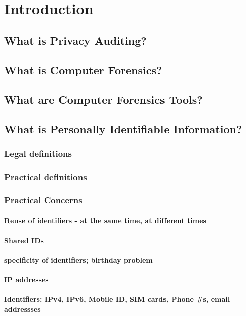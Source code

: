 \chapter{Introduction}
\section{What is Privacy Auditing?}
\section{What is Computer Forensics?}
\section{What are Computer Forensics Tools?}
\section{What is Personally Identifiable Information?}
\subsection{Legal definitions}
\subsection{Practical definitions}
\subsection{Practical Concerns}
\subsubsection{Reuse of identifiers - at the same time, at different times}
\subsubsection{Shared IDs}
\subsubsection{specificity of identifiers; birthday problem}
\subsubsection{IP addresses}
\subsubsection{Identifiers: IPv4, IPv6, Mobile ID, SIM cards, Phone \#s, email addressses}
